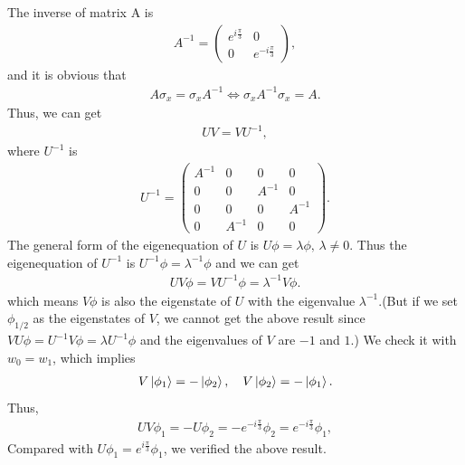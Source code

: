 \documentclass[10pt, oneside]{article}
\newcommand{\ph}{\phi}
\begin{document}
The inverse of matrix A is 
\begin{align}
	A^{-1} = \begin{pmatrix}
		e^{i \frac{\pi}{3}} & 0 \\
		0 & e^{-i \frac{\pi}{3}} 
	\end{pmatrix},
\end{align}
and it is obvious that 
\begin{align} 
	A \sigma_{x} = \sigma_{x} A^{-1} \Leftrightarrow \sigma_{x} A^{-1} \sigma_{x} =  A.
\end{align}
Thus, we can get 
\begin{align}
	UV = V U^{-1},
\end{align}
where \(U^{-1}\) is 
\begin{align}
	U^{-1} = \begin{pmatrix}
		A^{-1} & 0 & 0 & 0\\
		0 & 0 & A^{-1} & 0 \\
		0 & 0 & 0 & A^{-1} \\
		0 & A^{-1} & 0 & 0
	\end{pmatrix}.
\end{align}
The general form of the eigenequation of \(U\) is \(U \phi = \lambda \phi, \, \lambda \neq 0\). Thus the eigenequation of \(U^{-1}\) is \(U^{-1} \phi = \lambda^{-1} \phi\) and we can get 
\begin{align}
	\boxed{U V \phi = V U^{-1} \phi = \lambda^{-1} V \phi.}
\end{align}
which means \(V \phi\) is also the eigenstate of \(U\) with the eigenvalue \(\lambda^{-1}\).(But if we set \(\ph_{1/2}\) as the eigenstates of \(V\), we cannot get the above result since \(VU \phi = U^{-1} V \ph = \lambda U^{-1} \phi\) and the eigenvalues of \(V\) are \(-1\) and \(1\).) We check it with \(w_0 = w_1\), which implies 
\begin{align}
	V \ket{\ph_1} = - \ket{\ph_2}, \quad V \ket{\ph_2} = - \ket{\ph_1}. 
\end{align}
Thus, 
\begin{align}
	U V \ph_1 = - U \ph_2  =  - e^{ - i \frac{\pi}{3}} \ph_2 =  e^{ - i \frac{\pi}{3}} \phi_{1},
\end{align}
Compared with \(U \phi_1 = e^{i \frac{\pi}{3}} \phi_1\), we verified the above result.
\end{document}
